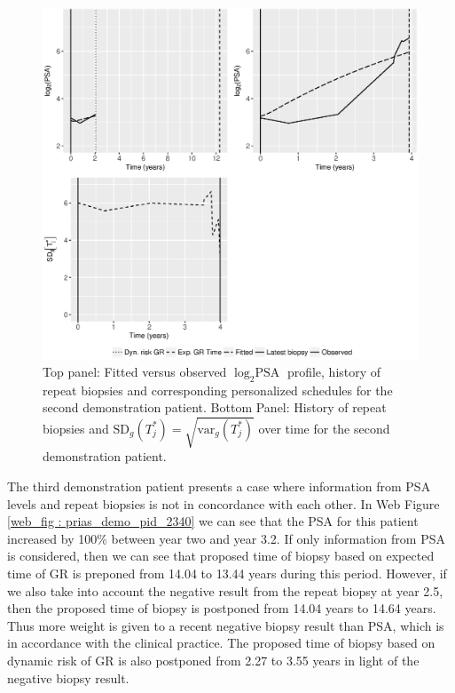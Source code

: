 \begin{figure}
\centerline{\includegraphics[width=\columnwidth]{images/prias_demo/case_3174_t3.eps}}
\caption{Top panel: Fitted versus observed $\log_2 \mbox{PSA}$ profile, history of repeat biopsies and corresponding personalized schedules for the second demonstration patient. Bottom Panel: History of repeat biopsies and $\mbox{SD}_g(T^*_j) = \sqrt{\mbox{var}_g(T^*_j)}$ over time for the second demonstration patient.}
\label{fig : prias_demo_pid_3174}
\end{figure}

\clearpage

The third demonstration patient presents a case where information from PSA levels and repeat biopsies is not in concordance with each other. In Web Figure \ref{web_fig : prias_demo_pid_2340} we can see that the PSA for this patient increased by 100\% between year two and year 3.2. If only information from PSA is considered, then we can see that proposed time of biopsy based on expected time of GR is preponed from 14.04 to 13.44 years during this period. However, if we also take into account the negative result from the repeat biopsy at year 2.5, then the proposed time of biopsy is postponed from 14.04 years to 14.64 years. Thus more weight is given to a recent negative biopsy result than PSA, which is in accordance with the clinical practice. The proposed time of biopsy based on dynamic risk of GR is also postponed from 2.27 to 3.55 years in light of the negative biopsy result.

